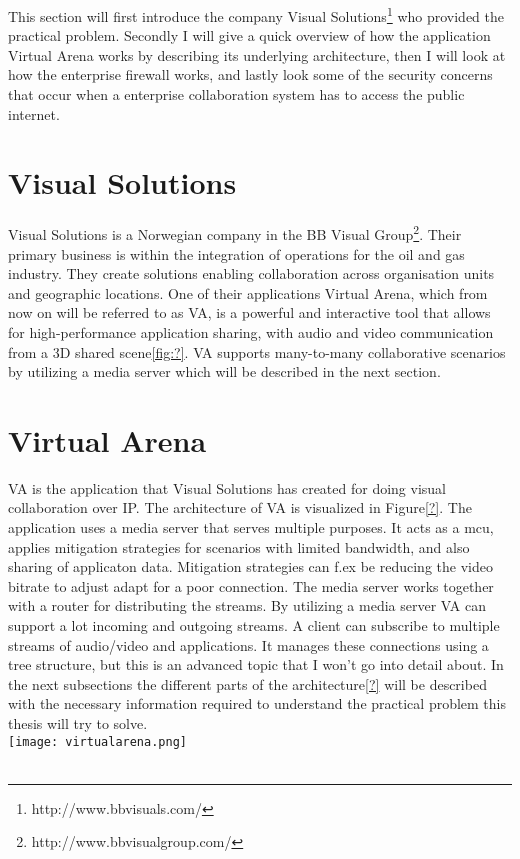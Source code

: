
This section will first introduce the company Visual Solutions\footnote{http://www.bbvisuals.com/} who provided the practical problem. Secondly I will give a quick overview of how the application Virtual Arena works by describing its underlying architecture, then I will look at how the enterprise firewall works, and lastly look some of the security concerns that occur when a enterprise collaboration system has to access the public internet.

\section{Visual Solutions}
Visual Solutions is a Norwegian company in the BB Visual Group\footnote{http://www.bbvisualgroup.com/}. Their primary business is within the integration of operations for the oil and gas industry. They create solutions enabling collaboration across organisation units and geographic locations. One of their applications Virtual Arena\cite{solutions_b2_virtual_2014}, which from now on will be referred to as VA, is a powerful and interactive tool that allows for high-performance application sharing, with audio and video communication from a 3D shared scene\ref{fig:?}. VA supports many-to-many collaborative scenarios by utilizing a media server which will be described in the next section. 

\section{Virtual Arena}
VA is the application that Visual Solutions has created for doing visual collaboration\cite{VirtualArena} over IP. The architecture of VA is visualized in Figure\ref{?}. The application uses a media server that serves multiple purposes. It acts as a \gls{mcu}, applies mitigation strategies for scenarios with limited bandwidth, and also sharing of applicaton data. Mitigation strategies can f.ex be reducing the video bitrate to adjust adapt for a poor connection. The media server works together with a router for distributing the streams. By utilizing a media server VA can support a lot incoming and outgoing streams. A client can subscribe to multiple streams of audio/video and applications. It manages these connections using a tree structure, but this is an advanced topic that I won't go into detail about. In the next subsections the different parts of the architecture\ref{?} will be described with the necessary information required to understand the practical problem this thesis will try to solve. 
\\
\texttt{[image: virtualarena.png]}
\\
\\

